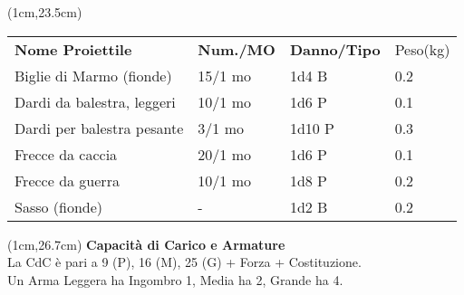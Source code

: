 \documentclass[a4paper,12 pt,openany]{book}
\begin{document}
\begin{textblock*}{11.5cm}(1cm,23.5cm) %

\begin{tabular}{llll}
\textbf{Nome Proiettile}   & \textbf{Num./MO} & \textbf{Danno/Tipo} & Peso(kg) \\
Biglie di Marmo (fionde)   & 15/1 mo                    & 1d4 B               & 0.2      \\
Dardi da balestra, leggeri & 10/1 mo                    & 1d6 P               & 0.1      \\
Dardi per balestra pesante & 3/1 mo                     & 1d10 P              & 0.3      \\
Frecce da caccia           & 20/1 mo                    & 1d6 P               & 0.1      \\
Frecce da guerra           & 10/1 mo                    & 1d8 P               & 0.2      \\
Sasso (fionde)             & -                          & 1d2 B               & 0.2      \\
\end{tabular}

\end{textblock*}

\begin{textblock*}{11.5cm}(1cm,26.7cm) %
\textbf{Capacità di Carico e Armature}\\
La CdC è pari a 9 (P), 16 (M), 25 (G) + Forza + Costituzione.\\
Un Arma Leggera ha Ingombro 1, Media ha 2, Grande ha 4.
\end{textblock*}

~\newpage
\end{document}
